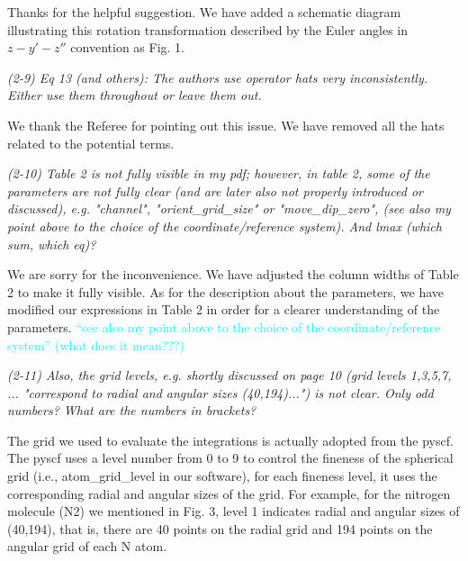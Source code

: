 \documentclass[a4paper,11pt]{article}
\newcommand{\cyan}[1]{\textcolor{cyan}{#1}}
\begin{document}
\vspace{1em}

Thanks for the helpful suggestion.
We have added a schematic diagram illustrating this rotation transformation described by the Euler angles in $z-y'-z''$ convention as Fig. 1.

\vspace{2em}


\textit{
(2-9)
Eq 13 (and others): The authors use operator hats very inconsistently. Either use them throughout or leave them out.
}

\vspace{1em}

We thank the Referee for pointing out this issue.
We have removed all the hats related to the potential terms.

\vspace{2em}


\textit{
(2-10)
Table 2 is not fully visible in my pdf; however, in table 2, some of the parameters are not fully clear (and are later also not properly introduced or discussed), e.g. "channel", "orient\_grid\_size" or "move\_dip\_zero", (see also my point above to the choice of the coordinate/reference system). And lmax (which sum, which eq)?
}

\vspace{1em}

We are sorry for the inconvenience. We have adjusted the column widths of Table 2 to make it fully visible.
As for the description about the parameters, we have modified our expressions in Table 2 in order for a clearer understanding of the parameters.
\cyan{``see also my point above to the choice of the coordinate/reference system'' (what does it mean???)}

\vspace{2em}


\textit{
(2-11)
Also, the grid levels, e.g. shortly discussed on page 10 (grid levels 1,3,5,7, ... "correspond to radial and angular sizes (40,194)...") is not clear. Only odd numbers? What are the numbers in brackets?
}

\vspace{1em}

The grid we used to evaluate the integrations is actually adopted from the pyscf.
The pyscf uses a level number from 0 to 9 to control the fineness of the spherical grid (i.e., atom\_grid\_level in our software),
for each fineness level, it uses the corresponding radial and angular sizes of the grid.
For example, for the nitrogen molecule (N2) we mentioned in Fig. 3, level 1 indicates radial and angular sizes of (40,194), that is, there are 40 points on the radial grid and 194 points on the angular grid of each N atom.
\end{document}
